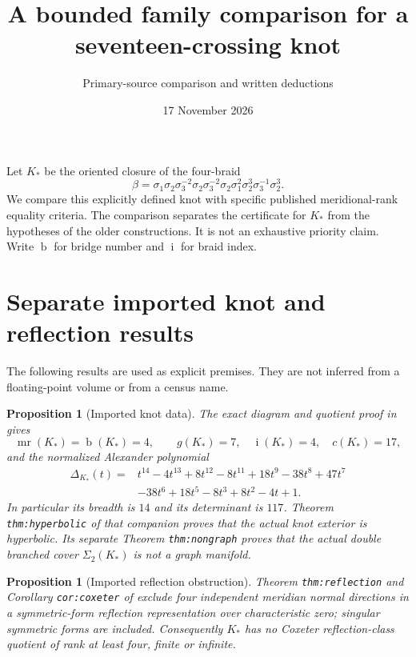 \documentclass[11pt]{article}
\title{A bounded family comparison for a seventeen-crossing knot}
\author{Primary-source comparison and written deductions}
\date{17 November 2026}
\newtheorem{proposition}[theorem]{Proposition}
\newcommand{\mr}{\operatorname{mr}}
\newcommand{\br}{\operatorname{b}}
\newcommand{\bi}{\operatorname{i}}
\begin{document}
\maketitle

Let $K_*$ be the oriented closure of the four-braid
\[
 \beta=\sigma_1\sigma_2\sigma_3^{-2}\sigma_2
 \sigma_3^{-2}\sigma_2\sigma_1^2\sigma_2^3
 \sigma_3^{-1}\sigma_2^3 .
\]
We compare this explicitly defined knot with specific published
meridional-rank equality criteria. The comparison separates the
certificate for $K_*$ from the hypotheses of the older constructions.
It is not an exhaustive priority claim. Write $\br$ for bridge number
and $\bi$ for braid index.

\section{Separate imported knot and reflection results}

The following results are used as explicit premises.
They are not inferred from a floating-point volume or from a census name.

\begin{proposition}[Imported knot data]\label{prop:data}
The exact diagram and quotient proof in \cite[Definition
\texttt{def:knot}, Theorems \texttt{thm:sharp} and
\texttt{thm:crossing}]{new17} gives
\[
 \mr(K_*)=\br(K_*)=4,\qquad
 g(K_*)=7,\quad \bi(K_*)=4,\quad c(K_*)=17,
\]
and the normalized Alexander polynomial
\[
\begin{split}
\Delta_{K_*}(t)={}&t^{14}-4t^{13}+8t^{12}-8t^{11}
 +18t^9-38t^8+47t^7\\
 &-38t^6+18t^5-8t^3+8t^2-4t+1 .
\end{split}
\]
In particular its breadth is $14$ and its determinant is $117$.
Theorem \texttt{thm:hyperbolic} of that companion proves that the
actual knot exterior is hyperbolic. Its separate Theorem
\texttt{thm:nongraph} proves that the actual double branched cover
$\Sigma_2(K_*)$ is not a graph manifold.
\end{proposition}

\begin{proposition}[Imported reflection obstruction]\label{prop:reflection}
Theorem \texttt{thm:reflection} and Corollary
\texttt{cor:coxeter} of \cite{universal} exclude four independent
meridian normal directions in a symmetric-form reflection
representation over characteristic zero; singular symmetric forms
are included. Consequently $K_*$ has no Coxeter reflection-class
quotient of rank at least four, finite or infinite.
\end{proposition}
\end{document}
